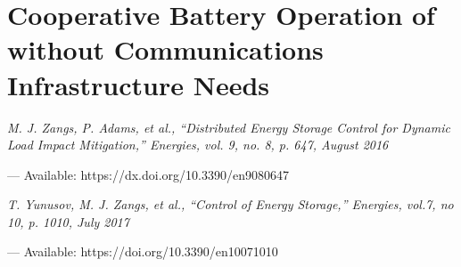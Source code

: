 \chapter{Cooperative Battery Operation of without Communications Infrastructure Needs}
\label{ch4}

\singlespacing
\epigraph{\textit{M. J. Zangs, P. Adams, et al., ``Distributed Energy Storage Control for Dynamic Load Impact Mitigation,'' Energies, vol. 9, no. 8, p. 647, August 2016}}{--- Available: https://dx.doi.org/10.3390/en9080647}
\epigraph{\textit{T. Yunusov, M. J. Zangs, et al., ``Control of Energy Storage,'' Energies, vol.7, no 10, p. 1010, July 2017}}{--- Available: https://doi.org/10.3390/en10071010}
\doublespacing













